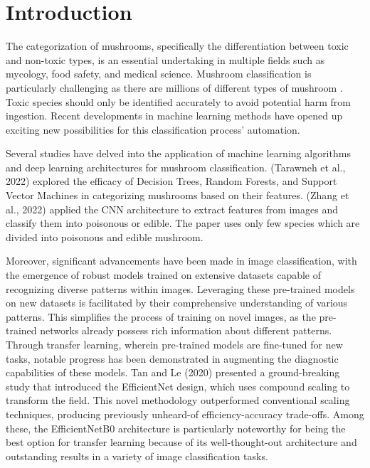 \section{Introduction}

The categorization of mushrooms, specifically the differentiation between toxic and non-toxic types, is an essential undertaking in multiple fields such as mycology, food safety, and medical science. Mushroom classification is particularly challenging as there are millions of different types of mushroom \cite{wibowo2018classification}. Toxic species should only be identified accurately to avoid potential harm from ingestion. Recent developments in machine learning methods have opened up exciting new possibilities for this classification process' automation.

Several studies have delved into the application of machine learning algorithms and deep learning architectures for mushroom classification. (Tarawneh et al., 2022) explored the efficacy of Decision Trees, Random Forests, and Support Vector Machines in categorizing mushrooms based on their features\cite{inproceedings}. (Zhang et al., 2022) applied the CNN architecture to extract features from images and classify them into poisonous or edible. The paper uses only few species which are divided into poisonous and edible mushroom.  

Moreover, significant advancements have been made in image classification, with the emergence of robust models trained on extensive datasets capable of recognizing diverse patterns within images. Leveraging these pre-trained models on new datasets is facilitated by their comprehensive understanding of various patterns. This simplifies the process of training on novel images, as the pre-trained networks already possess rich information about different patterns. Through transfer learning, wherein pre-trained models are fine-tuned for new tasks, notable progress has been demonstrated in augmenting the diagnostic capabilities of these models. Tan and Le (2020) presented a ground-breaking study that introduced the EfficientNet design, which uses compound scaling to transform the field\cite{tan2020efficientnet}. This novel methodology outperformed conventional scaling techniques, producing previously unheard-of efficiency-accuracy trade-offs. Among these, the EfficientNetB0 architecture is particularly noteworthy for being the best option for transfer learning because of its well-thought-out architecture and outstanding results in a variety of image classification tasks.

